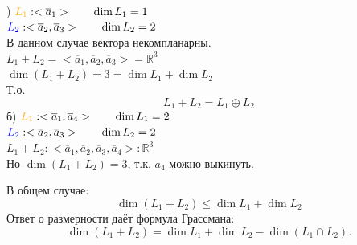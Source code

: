 ) ${\color{orange}L_1}: <\overline{a}_1> \qquad \dim L_1 = 1$\\
\phantom{а)}${\color{blue}L_2}: <\overline{a}_2, \overline{a}_3> \qquad \dim L_2 = 2$\\
В данном случае вектора некомпланарны.\\
$L_1+L_2=<\overline{a}_1, \overline{a}_2, \overline{a}_3> = \mathbb{R}^3$\\
$\dim (L_1 +L_2) = 3 = \dim L_1 + \dim L_2$\\
Т.о.
$$
L_1+L_2 = L_1 \oplus L_2
$$
б) ${\color{orange}L_1}: <\overline{a}_1, \overline{a}_4> \qquad \dim L_1 = 2$\\
${\color{blue}L_2}: <\overline{a}_2, \overline{a}_3> \qquad \dim L_2 = 2$\\
$L_1+L_2:<\overline{a}_1, \overline{a}_2, \overline{a}_3, \overline{a}_4>: \mathbb{R}^3$\\
Но $\dim (L_1+L_2)=3$, т.к. $\overline{a}_4$ можно выкинуть.

В общем случае:
$$
\dim (L_1+L_2) \leq \dim L_1 + \dim L_2
$$
Ответ о размерности даёт \textsf{формула Грассмана}:
$$
\dim (L_1+L_2)=\dim L_1+ \dim L_2 - \dim(L_1\cap L_2).
$$
